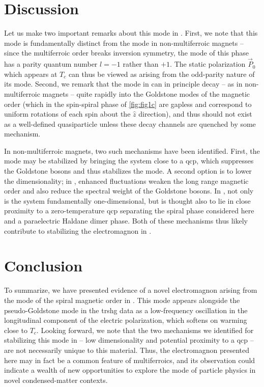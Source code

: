 \section{Discussion}
Let us make two important remarks about this mode in .
First, we note that this mode is fundamentally distinct from the \higgs mode in non-multiferroic magnets -- since the multiferroic order breaks inversion symmetry, the \higgs mode of this phase has a parity quantum number $l=-1$ rather than $+1$.
The static polarization $\vec{P}_0$ which appears at $T_c$ can thus be viewed as arising from the odd-parity nature of its \higgs mode.
Second, we remark that the \higgs mode in  can in principle decay -- as in non-multiferroic magnets -- quite rapidly into the Goldstone modes of the magnetic order (which in the spin-spiral phase of \cref{fig:fig1c} are gapless and correspond to uniform rotations of each spin about the $\hat{z}$ direction), and thus should not exist as a well-defined quasiparticle unless these decay channels are quenched by some mechanism.

In non-multiferroic magnets, two such mechanisms have been identified.
First, the \higgs mode may be stabilized by bringing the system close to a \gls{qcp}\cite{ruegg_quantum_2008,jain_higgs_2017,hong_higgs_2017,su_stable_2020}, which suppresses the Goldstone bosons and thus stabilizes the \higgs mode.
A second option is to lower the dimensionality\cite{canali_theory_1992,affleck_longitudinal_1992,schulz_dynamics_1996,essler_quasi-one-dimensional_1997,zhou_amplitude_2021}; in \oned, enhanced fluctuations weaken the long range magnetic order and also reduce the spectral weight of the Goldstone bosons\cite{zhou_amplitude_2021}. 
In , not only is the system fundamentally one-dimensional, but is thought also to lie in close proximity to a zero-temperature \gls{qcp}\cite{furukawa_ground-state_2012} separating the spiral phase considered here and a paraelectric Haldane dimer phase.
Both of these mechanisms thus likely contribute to stabilizing the \higgs electromagnon in .

\section{Conclusion}
To summarize, we have presented evidence of a novel electromagnon arising from the \higgs mode of the spiral magnetic order in .
This mode appears alongside the pseudo-Goldstone mode in the \gls{trshg} data as a low-frequency oscillation in the longitudinal component of the electric polarization, which softens on warming close to $T_c$.
Looking forward, we note that the two mechanisms we identified for stabilizing this mode in  -- low dimensionality and potential proximity to a \gls{qcp} -- are not necessarily unique to this material.
Thus, the \higgs electromagnon presented here may in fact be a common feature of \oned multiferroics, and its observation could indicate a wealth of new opportunities to explore the \higgs mode of particle physics in novel condensed-matter contexts.

